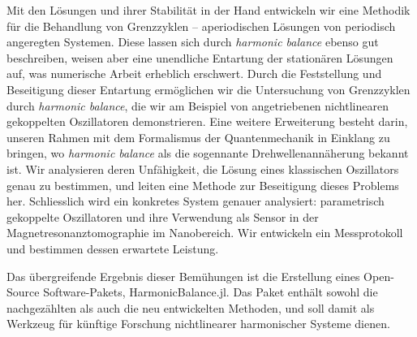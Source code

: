 Mit den Lösungen und ihrer Stabilität in der Hand entwickeln wir eine Methodik für die Behandlung von Grenzzyklen – aperiodischen Lösungen von periodisch angeregten Systemen. Diese lassen sich durch \textit{harmonic balance} ebenso gut beschreiben, weisen aber eine unendliche Entartung der stationären Lösungen auf, was numerische Arbeit erheblich erschwert. Durch die Feststellung und Beseitigung dieser Entartung ermöglichen wir die Untersuchung von Grenzzyklen durch \textit{harmonic balance}, die wir am Beispiel von angetriebenen nichtlinearen gekoppelten Oszillatoren demonstrieren. Eine weitere Erweiterung besteht darin, unseren Rahmen mit dem Formalismus der Quantenmechanik in Einklang zu bringen, wo \textit{harmonic balance} als die sogennante Drehwellenannäherung bekannt ist. Wir analysieren deren Unfähigkeit, die Lösung eines klassischen Oszillators genau zu bestimmen, und leiten eine Methode zur Beseitigung dieses Problems her. Schliesslich wird ein konkretes System genauer analysiert: parametrisch gekoppelte Oszillatoren und ihre Verwendung als Sensor in der Magnetresonanztomographie im Nanobereich. Wir entwickeln ein Messprotokoll und bestimmen dessen erwartete Leistung.

Das übergreifende Ergebnis dieser Bemühungen ist die Erstellung eines Open-Source Software-Pakets, HarmonicBalance.jl. Das Paket enthält sowohl die nachgezählten als auch die neu entwickelten Methoden, und soll damit als Werkzeug für künftige Forschung nichtlinearer harmonischer Systeme dienen. 

